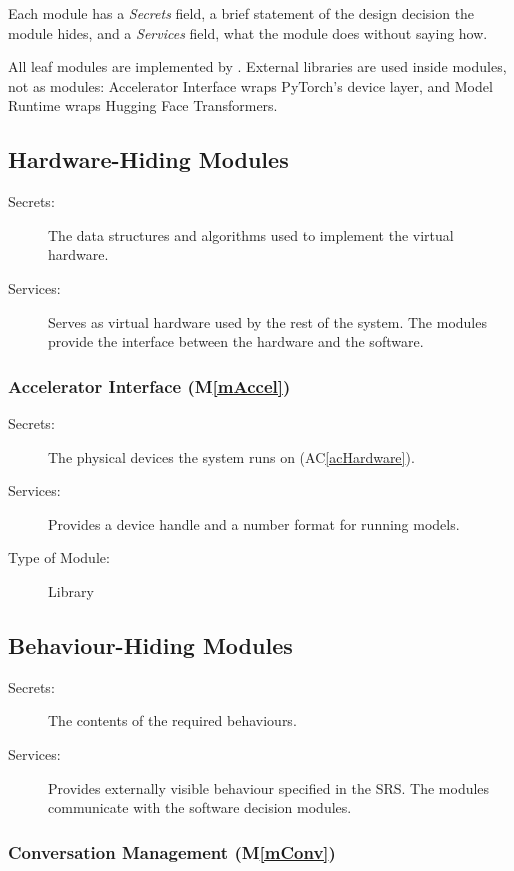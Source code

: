 \documentclass[12pt, titlepage]{article}
\newcommand{\acref}[1]{AC\ref{#1}}
\newcommand{\mref}[1]{M\ref{#1}}
\begin{document}
Each module has a \emph{Secrets} field, a brief statement of the design decision
the module hides, and a \emph{Services} field, what the module does without
saying how.

All leaf modules are implemented by \progname{}. External libraries are used
inside modules, not as modules: Accelerator Interface wraps PyTorch's device
layer, and Model Runtime wraps Hugging Face Transformers.

\subsection{Hardware-Hiding Modules}

\begin{description}
\item[Secrets:] The data structures and algorithms used to implement the virtual
  hardware.
\item[Services:] Serves as virtual hardware used by the rest of the system. The
  modules provide the interface between the hardware and the software.
\end{description}

\subsubsection{Accelerator Interface (\mref{mAccel})}

\begin{description}
\item[Secrets:] The physical devices the system runs on (\acref{acHardware}).
\item[Services:] Provides a device handle and a number format for running
  models.
\item[Type of Module:] Library
\end{description}

\subsection{Behaviour-Hiding Modules}

\begin{description}
\item[Secrets:] The contents of the required behaviours.
\item[Services:] Provides externally visible behaviour specified in the SRS. The
  modules communicate with the software decision modules.
\end{description}

\subsubsection{Conversation Management (\mref{mConv})}
\end{document}
